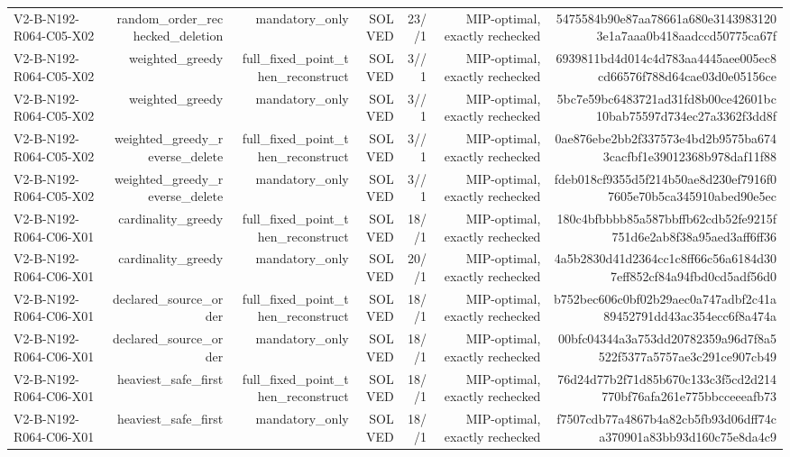 {\begin{longtable}{lrrrrrr}
V2-B-N192-R064-C05-X02 & random\_order\_rechecked\_deletion & mandatory\_only & SOLVED & 23//1 & MIP-optimal, exactly rechecked & 5475584b90e87aa78661a680e31439831203e1a7aaa0b418aadccd50775ca67f \\
V2-B-N192-R064-C05-X02 & weighted\_greedy & full\_fixed\_point\_then\_reconstruct & SOLVED & 3//1 & MIP-optimal, exactly rechecked & 6939811bd4d014c4d783aa4445aee005ec8cd66576f788d64cae03d0e05156ce \\
V2-B-N192-R064-C05-X02 & weighted\_greedy & mandatory\_only & SOLVED & 3//1 & MIP-optimal, exactly rechecked & 5bc7e59bc6483721ad31fd8b00ce42601bc10bab75597d734ec27a3362f3dd8f \\
V2-B-N192-R064-C05-X02 & weighted\_greedy\_reverse\_delete & full\_fixed\_point\_then\_reconstruct & SOLVED & 3//1 & MIP-optimal, exactly rechecked & 0ae876ebe2bb2f337573e4bd2b9575ba6743cacfbf1e39012368b978daf11f88 \\
V2-B-N192-R064-C05-X02 & weighted\_greedy\_reverse\_delete & mandatory\_only & SOLVED & 3//1 & MIP-optimal, exactly rechecked & fdeb018cf9355d5f214b50ae8d230ef7916f07605e70b5ca345910abed90e5ec \\
V2-B-N192-R064-C06-X01 & cardinality\_greedy & full\_fixed\_point\_then\_reconstruct & SOLVED & 18//1 & MIP-optimal, exactly rechecked & 180c4bfbbbb85a587bbffb62cdb52fe9215f751d6e2ab8f38a95aed3aff6ff36 \\
V2-B-N192-R064-C06-X01 & cardinality\_greedy & mandatory\_only & SOLVED & 20//1 & MIP-optimal, exactly rechecked & 4a5b2830d41d2364cc1c8ff66c56a6184d307eff852cf84a94fbd0cd5adf56d0 \\
V2-B-N192-R064-C06-X01 & declared\_source\_order & full\_fixed\_point\_then\_reconstruct & SOLVED & 18//1 & MIP-optimal, exactly rechecked & b752bec606c0bf02b29aec0a747adbf2c41a89452791dd43ac354ecc6f8a474a \\
V2-B-N192-R064-C06-X01 & declared\_source\_order & mandatory\_only & SOLVED & 18//1 & MIP-optimal, exactly rechecked & 00bfc04344a3a753dd20782359a96d7f8a5522f5377a5757ae3c291ce907cb49 \\
V2-B-N192-R064-C06-X01 & heaviest\_safe\_first & full\_fixed\_point\_then\_reconstruct & SOLVED & 18//1 & MIP-optimal, exactly rechecked & 76d24d77b2f71d85b670c133c3f5cd2d214770bf76afa261e775bbcceeeafb73 \\
V2-B-N192-R064-C06-X01 & heaviest\_safe\_first & mandatory\_only & SOLVED & 18//1 & MIP-optimal, exactly rechecked & f7507cdb77a4867b4a82cb5fb93d06dff74ca370901a83bb93d160c75e8da4c9 \\

\end{longtable}}
